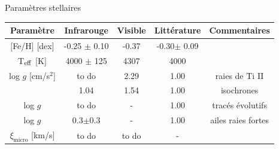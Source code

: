 \documentclass[10pt]{beamer}
\begin{document}
\begin{frame}[fragile]{Paramètres stellaires}
    \begin{table}[h!]
        \begin{center}
            \renewcommand{\arraystretch}{1.5}
            \begin{tabular}{c|ccc|c}
                Paramètre & Infrarouge &Visible& Littérature &Commentaires\\
                \hline
                
                $[$Fe/H$]$ [dex]& -0.25 $\pm$ 0.10 & -0.37 &
                -0.30$\pm$ 0.09&\\
                T$_{\rm eff}$ [K] & 4000 $\pm$ 125 &4307 & 4000& \\
    
                log $g$ [cm/s$^2$]& to do & 2.29 & 1.00&raies de Ti II\\
                \arrayrulecolor{red}\hline
                \multicolumn{1}{|c}{log $g$ }& 1.04 & 1.54 & 1.00 &\multicolumn{1}{c|}{isochrones}\\
                  \arrayrulecolor{red}\hline
                log $g$ & to do & - & 1.00 &tracés évolutifs\\
                log $g$ & 0.3$\pm$0.3 &-& 1.00 &ailes raies fortes\\
                $\xi_{\text{micro}}$ [km/s]& to do & to do & - &\\
            \end{tabular}
        \end{center}
    \end{table}
    \end{frame}
\end{document}
